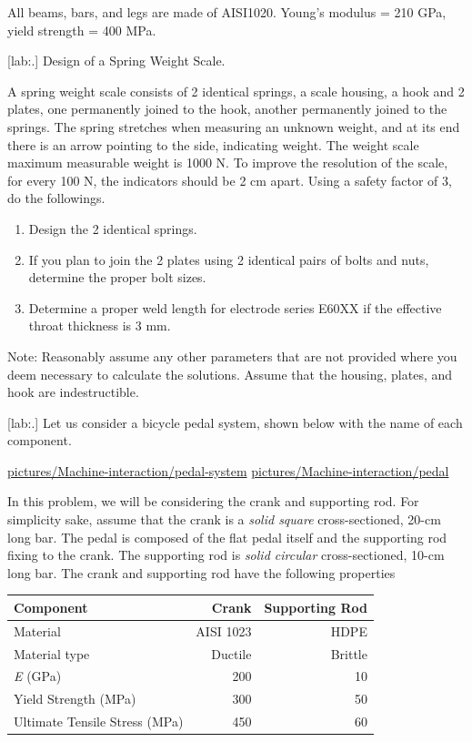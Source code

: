 \documentclass[a4paper,openany,12pt]{book}
\begin{document}
{{All beams, bars, and legs are made of AISI1020. Young's modulus = 210
GPa, yield strength = 400 MPa.

[lab:.] Design of a Spring Weight
Scale.

A spring weight scale consists of 2 identical springs, a scale housing,
a hook and 2 plates, one permanently joined to the hook, another
permanently joined to the springs. The spring stretches when measuring
an unknown weight, and at its end there is an arrow pointing to the
side, indicating weight. The weight scale maximum measurable weight is
1000 N. To improve the resolution of the scale, for every 100 N, the
indicators should be 2 cm apart. Using a safety factor of 3, do the
followings.

\begin{enumerate}
\item Design the 2 identical springs.

\item If you plan to join the 2 plates using 2 identical pairs of bolts and
nuts, determine the proper bolt sizes.

\item Determine a proper weld length for electrode series E60XX if the
effective throat thickness is 3 mm.
\end{enumerate}

Note: Reasonably assume any other parameters that are not provided where
you deem necessary to calculate the solutions. Assume that the housing,
plates, and hook are indestructible.

[lab:.] Let us consider a bicycle
pedal system, shown below with the name of each component.

\url{pictures/Machine-interaction/pedal-system}
\url{pictures/Machine-interaction/pedal}

In this problem, we will be considering the crank and supporting rod.
For simplicity sake, assume that the crank is a \emph{solid square}
cross-sectioned, 20-cm long bar. The pedal is composed of the flat pedal
itself and the supporting rod fixing to the crank. The supporting rod is
\emph{solid circular} cross-sectioned, 10-cm long bar. The crank and
supporting rod have the following properties

\begin{center}
\begin{tabular}{lrr}
Component & Crank & Supporting Rod\\
\hline
Material & AISI 1023 & HDPE\\
Material type & Ductile & Brittle\\
\emph{E} (GPa) & 200 & 10\\
Yield Strength (MPa) & 300 & 50\\
Ultimate Tensile Stress (MPa) & 450 & 60\\
\end{tabular}
\end{center}

}}
\end{document}
